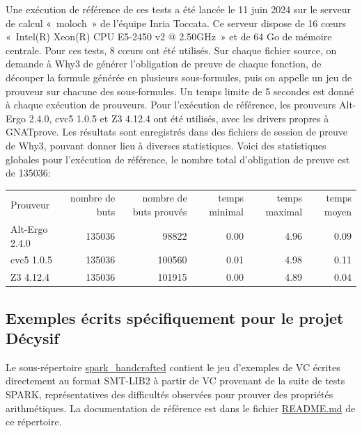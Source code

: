 \documentclass[a4paper,11pt]{article}
\begin{document}
Une exécution de référence de ces tests a été lancée le 11 juin 2024
sur le serveur de calcul «~moloch~» de l'équipe Inria Toccata. Ce
serveur dispose de 16 c{\oe}urs «~Intel(R) Xeon(R) CPU E5-2450 v2 @
2.50GHz~» et de 64 Go de mémoire centrale. Pour ces tests, 8 c{\oe}urs
ont été utilisés. Sur chaque fichier source, on demande à Why3 de
générer l'obligation de preuve de chaque fonction, de découper la
formule générée en plusieurs sous-formules, puis on appelle un jeu de
prouveur sur chacune des sous-formules. Un temps limite de 5 secondes est donné à chaque exécution de prouveurs. Pour l'exécution de référence,
les prouveurs Alt-Ergo 2.4.0, cvc5 1.0.5 et Z3 4.12.4 ont
été utilisés, avec les drivers propres à GNATprove.
Les résultats sont enregistrés dans des fichiers de
session de preuve de Why3, pouvant donner lieu à diverses
statistiques. Voici des statistiques globales pour l'exécution de
référence, le nombre total d'obligation de preuve est de 135036:
\begin{center}
  \begin{tabular}{|l|r|r|r|r|r|}
    \hline
  \rowcolor{gray!50} Prouveur
  & \multicolumn{1}{p{0.13\textwidth}|}{nombre de buts}
  & \multicolumn{1}{p{0.13\textwidth}|}{nombre de buts prouvés}
  & \multicolumn{1}{p{0.13\textwidth}|}{temps minimal}
  & \multicolumn{1}{p{0.13\textwidth}|}{temps maximal}
  & \multicolumn{1}{p{0.13\textwidth}|}{temps moyen}
  \\
  Alt-Ergo 2.4.0                & 135036 &  98822 &  0.00  & 4.96 &  0.09 \\
  cvc5 1.0.5                    & 135036 & 100560 &  0.01  & 4.98 &  0.11 \\
  Z3 4.12.4                     & 135036 & 101915 &  0.00  & 4.89 &  0.04 \\
\hline
\end{tabular}
\end{center}

\subsection{Exemples écrits spécifiquement pour le projet Décysif}

Le sous-répertoire \url{spark_handcrafted} contient le jeu d'exemples de VC
écrites directement au format SMT-LIB2 à partir de VC provenant de la suite de
tests SPARK, représentatives des difficultés observées pour prouver des
propriétés arithmétiques. La documentation de référence est dans le fichier
\url{README.md} de ce répertoire.
\end{document}
